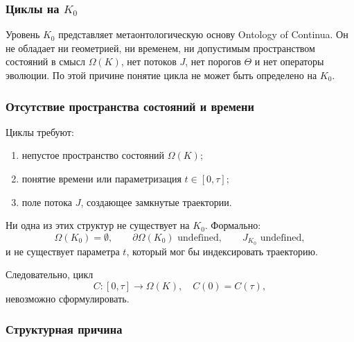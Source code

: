 
\subsubsection{Циклы на \texorpdfstring{$K_0$}{K_0}}
\label{sec:cycles-k0}

Уровень $K_0$ представляет метаонтологическую основу
Ontology of Continua.
Он не обладает ни геометрией, ни временем, ни допустимым пространством состояний в
смысл $\Omega(K)$, нет потоков $J$, нет порогов $\Theta$ и нет
операторы эволюции.
По этой причине понятие цикла не может быть определено на $K_0$.

\subsubsection{Отсутствие пространства состояний и времени}

Циклы требуют:
\begin{enumerate}
  \item непустое пространство состояний $\Omega(K)$;
  \item понятие времени или параметризация $t\in[0,\tau]$;
  \item поле потока $J$, создающее замкнутые траектории.
\end{enumerate}

Ни одна из этих структур не существует на $K_0$.
Формально:
\[
  \Omega(K_0)=\emptyset, \qquad
  \partial\Omega(K_0) \text{ undefined}, \qquad
  J_{K_0} \text{ undefined},
\]
и не существует параметра $t$, который мог бы индексировать траекторию.

Следовательно, цикл
\[
  C:[0,\tau]\to\Omega(K), \quad C(0)=C(\tau),
\]
невозможно сформулировать.

\subsubsection{Структурная причина}

